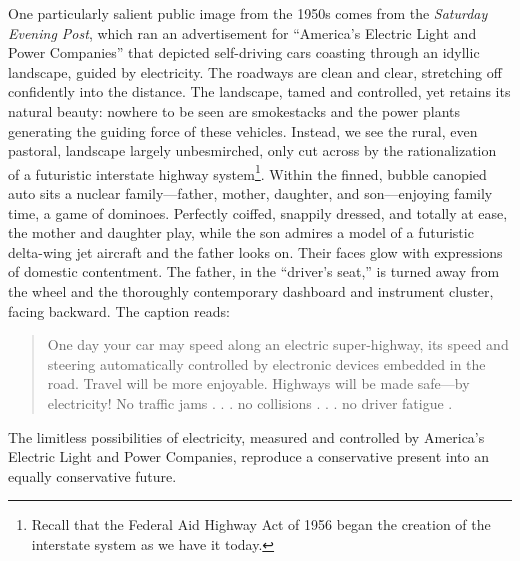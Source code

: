 One particularly salient public image from the 1950s comes from the
\emph{Saturday Evening Post}, which ran an advertisement for ``America's
Electric Light and Power Companies'' that depicted self-driving cars
coasting through an idyllic landscape, guided by electricity.\cite{???} The roadways
are clean and clear, stretching off confidently into the distance. The
landscape, tamed and controlled, yet retains its natural beauty:
nowhere to be seen are smokestacks and the power plants generating the
guiding force of these vehicles. Instead, we see the rural, even
pastoral, landscape largely unbesmirched, only cut across by the
rationalization of a futuristic interstate highway system\footnote{Recall that
the Federal Aid Highway Act of 1956 began the creation of the
interstate system as we have it today.}. Within the finned, bubble
canopied auto sits a nuclear family---father,
mother, daughter, and son---enjoying family time, a game of dominoes.
Perfectly coiffed, snappily dressed, and totally at ease, the mother
and daughter play, while the son admires a model of a futuristic
delta-wing jet aircraft and the father looks on. Their faces glow with
expressions of domestic contentment. The father, in the ``driver's
seat,'' is turned away from the wheel and the thoroughly contemporary
dashboard and instrument cluster, facing backward. The caption reads: 
\begin{quote}
One day your car may speed along an electric super-highway, its speed
and steering automatically controlled by electronic devices embedded
in the road. Travel will be more enjoyable. Highways will be made
safe---by electricity! No traffic jams . . . no collisions . . . no
driver fatigue \cite{???}.
\end{quote}
The limitless possibilities of electricity, measured and controlled by
America's Electric Light and Power Companies, reproduce a conservative
present into an equally conservative future. 

